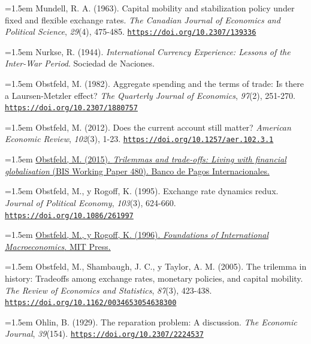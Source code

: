 \documentclass[10pt,a4paper]{article}
\begin{document}
\noindent\hangindent=1.5em Mundell, R. A. (1963). Capital mobility and stabilization policy under fixed and flexible exchange rates. \textit{The Canadian Journal of Economics and Political Science}, \textit{29}(4), 475-485. \href{https://doi.org/10.2307/139336}{\nolinkurl{https://doi.org/10.2307/139336}}

\noindent\hangindent=1.5em Nurkse, R. (1944). \textit{International Currency Experience: Lessons of the Inter-War Period}. Sociedad de Naciones.

\noindent\hangindent=1.5em Obstfeld, M. (1982). Aggregate spending and the terms of trade: Is there a Laursen-Metzler effect? \textit{The Quarterly Journal of Economics}, \textit{97}(2), 251-270. \href{https://doi.org/10.2307/1880757}{\nolinkurl{https://doi.org/10.2307/1880757}}

\noindent\hangindent=1.5em Obstfeld, M. (2012). Does the current account still matter? \textit{American Economic Review}, \textit{102}(3), 1-23. \href{https://doi.org/10.1257/aer.102.3.1}{\nolinkurl{https://doi.org/10.1257/aer.102.3.1}}

\noindent\hangindent=1.5em \href{https://www.bis.org/publ/work480.htm}{Obstfeld, M. (2015). \textit{Trilemmas and trade-offs: Living with financial globalisation} (BIS Working Paper 480). Banco de Pagos Internacionales.}

\noindent\hangindent=1.5em Obstfeld, M., y Rogoff, K. (1995). Exchange rate dynamics redux. \textit{Journal of Political Economy}, \textit{103}(3), 624-660. \href{https://doi.org/10.1086/261997}{\nolinkurl{https://doi.org/10.1086/261997}}

\noindent\hangindent=1.5em \href{https://mitpress.mit.edu/9780262150477/foundations-of-international-macroeconomics/}{Obstfeld, M., y Rogoff, K. (1996). \textit{Foundations of International Macroeconomics}. MIT Press.}

\noindent\hangindent=1.5em Obstfeld, M., Shambaugh, J. C., y Taylor, A. M. (2005). The trilemma in history: Tradeoffs among exchange rates, monetary policies, and capital mobility. \textit{The Review of Economics and Statistics}, \textit{87}(3), 423-438. \href{https://doi.org/10.1162/0034653054638300}{\nolinkurl{https://doi.org/10.1162/0034653054638300}}

\noindent\hangindent=1.5em Ohlin, B. (1929). The reparation problem: A discussion. \textit{The Economic Journal}, \textit{39}(154). \href{https://doi.org/10.2307/2224537}{\nolinkurl{https://doi.org/10.2307/2224537}}
\end{document}
